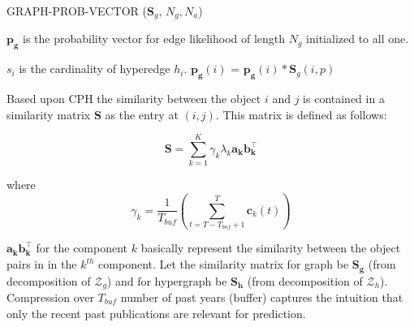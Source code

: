 \documentclass[twoside,leqno,twocolumn]{article}
\begin{document}
\begin{algorithm} %
\caption{GRAPH-PROB-VECTOR ($\mathbf{S}_g$, $N_g, N_a$)} %
\label{alg2} %
\begin{algorithmic}[1] %

\STATE $\mathbf{p_g}$ is the probability vector for edge likelihood of length $N_g$ initialized to all one.

\STATE $s_i$ is the cardinality of hyperedge $h_i$.
\STATE $\mathbf{p_g}(i)$ = $\mathbf{p_g}(i) \ast \mathbf{S}_g (i,p)$ 
\ENDFOR 
\ENDFOR 
\ENDFOR \\


\end{algorithmic}
\end{algorithm}

Based upon CPH the similarity between the object \(i\) and \(j\) is contained in a similarity matrix $\mathbf{S}$ as the entry at $(i,j)$. This matrix is defined as follows:

\begin{equation}
\mathbf{S} = \sum \limits_{k=1}^{K} \gamma_k \lambda_k \mathbf{a_k} \mathbf{b_k^\top}
\end{equation}

where \begin{equation} \gamma_k = \frac{1}{T_{buf}} \left( \sum \limits_{t=T-T_{buf}+1}^{T} \mathbf{c}_k(t) \right) \end{equation}


$\mathbf{a_kb_k^{\top}}$ for the component $k$ basically represent the similarity between the object pairs in in the $k^{th}$ component. Let the similarity matrix for graph be $\mathbf{S_g}$ (from decomposition of $\mathscr{Z}_{g}$) and for hypergraph be $\mathbf{S_h}$ (from decomposition of $\mathscr{Z}_{h}$). Compression over $T_{buf}$ number of past years (buffer) captures the intuition that only the recent past publications are relevant for prediction. 

\end{document}
